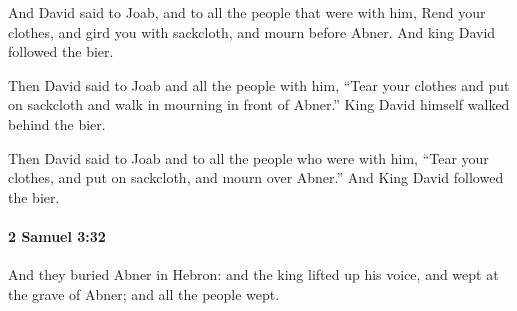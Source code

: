 			\begin{versebox}
					\item[BHS] 
					\item[ASV] And David said to Joab, and to all the people that were with him, Rend your clothes, and gird you with sackcloth, and mourn before Abner. And king David followed the bier.
					\item[NIV] Then David said to Joab and all the people with him, “Tear your clothes and put on sackcloth and walk in mourning in front of Abner.” King David himself walked behind the bier.
					\item[NRSV] Then David said to Joab and to all the people who were with him, “Tear your clothes, and put on sackcloth, and mourn over Abner.” And King David followed the bier.
			\end{versebox}

		\paragraph{2 Samuel 3:32} %
			\label{2SAMUEL-3-32}

			And they buried Abner in Hebron: and the king lifted up his voice, and wept at the grave of Abner; and all the people wept.

